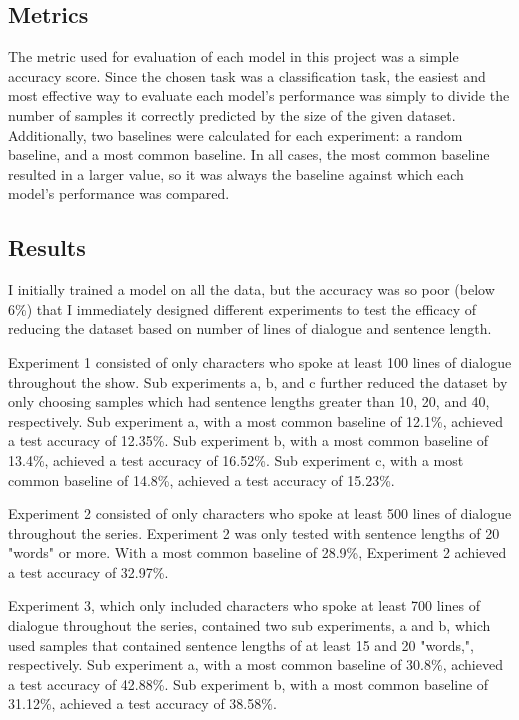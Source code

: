 \documentclass[11pt]{article}
\begin{document}
\subsection{Metrics}

The metric used for evaluation of each model in this project was a simple accuracy score. Since the chosen task was a classification task, the easiest and most effective way to evaluate each model's performance was simply to divide the number of samples it correctly predicted by the size of the given dataset. Additionally, two baselines were calculated for each experiment: a random baseline, and a most common baseline. In all cases, the most common baseline resulted in a larger value, so it was always the baseline against which each model's performance was compared.

\subsection{Results}

I initially trained a model on all the data, but the accuracy was so poor (below 6\%) that I immediately designed different experiments to test the efficacy of reducing the dataset based on number of lines of dialogue and sentence length.

Experiment 1 consisted of only characters who spoke at least 100 lines of dialogue throughout the show. Sub experiments a, b, and c further reduced the dataset by only choosing samples which had sentence lengths greater than 10, 20, and 40, respectively. Sub experiment a, with a most common baseline of 12.1\%, achieved a test accuracy of 12.35\%. Sub experiment b, with a most common baseline of 13.4\%, achieved a test accuracy of 16.52\%. Sub experiment c, with a most common baseline of 14.8\%, achieved a test accuracy of 15.23\%.

Experiment 2 consisted of only characters who spoke at least 500 lines of dialogue throughout the series. Experiment 2 was only tested with sentence lengths of 20 "words" or more. With a most common baseline of 28.9\%, Experiment 2 achieved a test accuracy of 32.97\%.

Experiment 3, which only included characters who spoke at least 700 lines of dialogue throughout the series, contained two sub experiments, a and b, which used samples that contained sentence lengths of at least 15 and 20 "words,", respectively. Sub experiment a, with a most common baseline of 30.8\%, achieved a test accuracy of 42.88\%. Sub experiment b, with a most common baseline of 31.12\%, achieved a test accuracy of 38.58\%.
\end{document}
